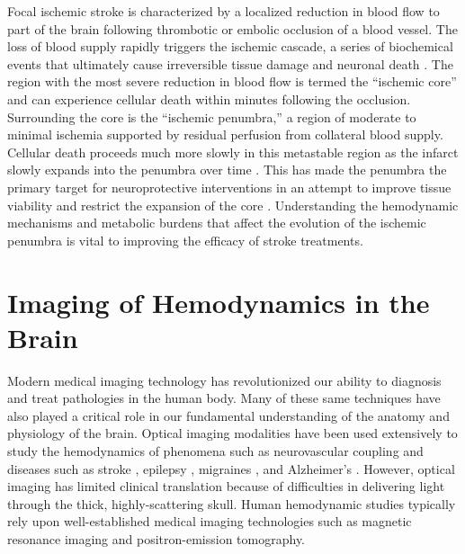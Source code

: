 Focal ischemic stroke is characterized by a localized reduction in blood flow to part of the brain following thrombotic or embolic occlusion of a blood vessel. The loss of blood supply rapidly triggers the ischemic cascade, a series of biochemical events that ultimately cause irreversible tissue damage and neuronal death \cite{Nesto:1987dx}. The region with the most severe reduction in blood flow is termed the ``ischemic core'' and can experience cellular death within minutes following the occlusion. Surrounding the core is the ``ischemic penumbra,'' a region of moderate to minimal ischemia supported by residual perfusion from collateral blood supply. Cellular death proceeds much more slowly in this metastable region as the infarct slowly expands into the penumbra over time \cite{Heiss:1992ge, Ginsberg:1999jy}. This has made the penumbra the primary target for neuroprotective interventions in an attempt to improve tissue viability and restrict the expansion of the core \cite{Felberg:2000gu, RamosCabrer:2011gz}. Understanding the hemodynamic mechanisms and metabolic burdens that affect the evolution of the ischemic penumbra is vital to improving the efficacy of stroke treatments.



\section{Imaging of Hemodynamics in the Brain}

Modern medical imaging technology has revolutionized our ability to diagnosis and treat pathologies in the human body. Many of these same techniques have also played a critical role in our fundamental understanding of the anatomy and physiology of the brain. Optical imaging modalities have been used extensively \cite{Hillman:2007ep} to study the hemodynamics of phenomena such as neurovascular coupling \cite{Liao:2013jl} and diseases such as stroke \cite{Obrig:2011hy}, epilepsy \cite{Bahar:2006es}, migraines \cite{Bolay:2002jg}, and Alzheimer's \cite{KoronyoHamaoui:2011hk}. However, optical imaging has limited clinical translation because of difficulties in delivering light through the thick, highly-scattering skull. Human hemodynamic studies typically rely upon well-established medical imaging technologies such as magnetic resonance imaging and positron-emission tomography.

